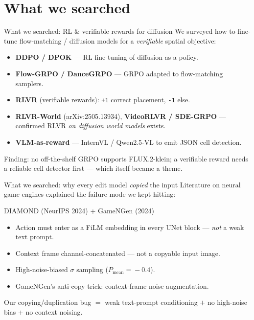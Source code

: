 \documentclass[aspectratio=169,11pt]{beamer}
\newcommand{\code}[1]{\texttt{\small #1}}
\begin{document}
\section{What we searched}
\begin{frame}{What we searched: RL \& verifiable rewards for diffusion}
  We surveyed how to fine-tune flow-matching / diffusion models for a
  \emph{verifiable} spatial objective:
  \vspace{0.4em}
  \begin{itemize}
    \item \textbf{DDPO / DPOK} --- RL fine-tuning of diffusion as a policy.
    \item \textbf{Flow-GRPO / DanceGRPO} --- GRPO adapted to flow-matching samplers.
    \item \textbf{RLVR} (verifiable rewards): \code{+1} correct placement, \code{-1} else.
    \item \textbf{RLVR-World} (arXiv:2505.13934), \textbf{VideoRLVR / SDE-GRPO} ---
          confirmed RLVR \emph{on diffusion world models} exists.
    \item \textbf{VLM-as-reward} --- InternVL / Qwen2.5-VL to emit JSON cell detection.
  \end{itemize}
  \vspace{0.3em}
  \footnotesize Finding: no off-the-shelf GRPO supports FLUX.2-klein; a verifiable
  reward needs a reliable cell detector first --- which itself became a theme.
\end{frame}

\begin{frame}{What we searched: why every edit model \emph{copied} the input}
  Literature on neural game engines explained the failure mode we kept hitting:
  \vspace{0.5em}
  \begin{block}{DIAMOND (NeurIPS 2024) + GameNGen (2024)}
    \begin{itemize}
      \item Action must enter as a \alert{FiLM embedding in every UNet block} ---
            \emph{not} a weak text prompt.
      \item Context frame \alert{channel-concatenated} --- not a copyable input image.
      \item \alert{High-noise-biased} $\sigma$ sampling ($P_{\text{mean}}\!=\!-0.4$).
      \item GameNGen's anti-copy trick: \alert{context-frame noise augmentation}.
    \end{itemize}
  \end{block}
  \footnotesize Our copying/duplication bug $=$ weak text-prompt conditioning
  $+$ no high-noise bias $+$ no context noising.
\end{frame}
\end{document}
